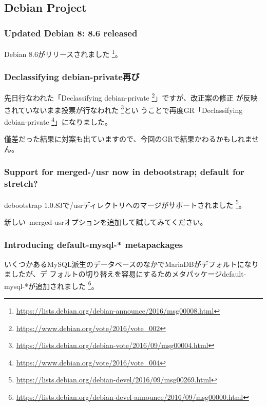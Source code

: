 \documentclass[mingoth,a4paper]{jsarticle}
\begin{document}
\subsection{Debian Project}

\subsubsection{Updated Debian 8: 8.6 released}

Debian 8.6がリリースされました
\footnote{\url{https://lists.debian.org/debian-announce/2016/msg00008.html}}。


\subsubsection{Declassifying debian-private再び}

先日行なわれた「Declassifying debian-private
\footnote{\url{https://www.debian.org/vote/2016/vote_002}}」ですが、改正案の修正
が反映されていないまま投票が行なわれた
\footnote{\url{https://lists.debian.org/debian-vote/2016/09/msg00004.html}}とい
うことで再度GR「Declassifying debian-private
\footnote{\url{https://www.debian.org/vote/2016/vote_004}}」になりました。

僅差だった結果に対案も出ていますので、今回のGRで結果かわるかもしれません。


\subsubsection{Support for merged-/usr now in debootstrap; default for stretch?}

debootstrap 1.0.83で/usrディレクトリへのマージがサポートされました
\footnote{\url{https://lists.debian.org/debian-devel/2016/09/msg00269.html}}。

新しい--merged-usrオプションを追加して試してみてください。



\subsubsection{Introducing default-mysql-* metapackages}

いくつかあるMySQL派生のデータベースのなかでMariaDBがデフォルトになりましたが、デ
フォルトの切り替えを容易にするためメタパッケージdefault-mysql-*が追加されました
\footnote{\url{https://lists.debian.org/debian-devel-announce/2016/09/msg00000.html}}。
\end{document}
